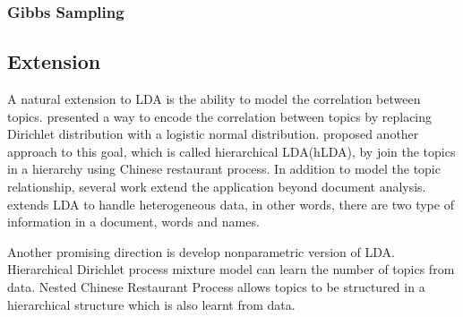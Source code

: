 \subsubsection{Gibbs Sampling}
\cite{casella1992explaining}


\subsection{Extension}
A natural extension to LDA is the ability to model the correlation between topics. \cite{lafferty2005correlated} presented a way to encode the correlation between topics by replacing Dirichlet distribution with a logistic normal distribution. \cite{griffiths2004hierarchical} proposed another approach to this goal, which is called hierarchical LDA(hLDA), by join the topics in a hierarchy using Chinese restaurant process. In addition to model the topic relationship, several work extend the application beyond document analysis. \cite{shu2009latent} extends LDA to handle heterogeneous data, in other words, there are two type of information in a document, words and names. 

Another promising direction is develop nonparametric version of LDA. Hierarchical Dirichlet process mixture model \cite{teh2006hierarchical} can learn the number of topics from data. Nested Chinese Restaurant Process \cite{griffiths2004hierarchical} allows topics to be structured in a hierarchical structure which is also learnt from data. 

